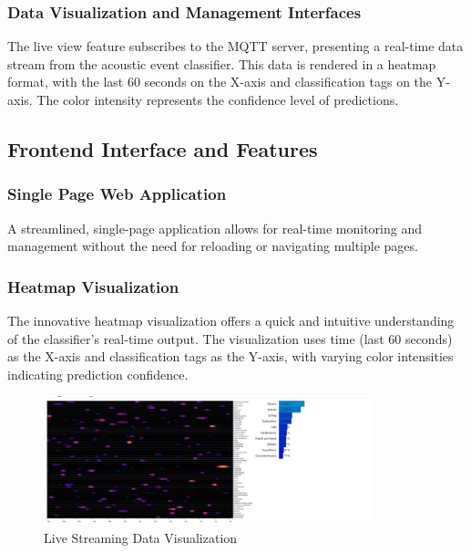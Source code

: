 \subsubsection{Data Visualization and Management Interfaces}
The live view feature subscribes to the MQTT server, presenting a real-time data stream from the acoustic event classifier. This data is rendered in a heatmap format, with the last 60 seconds on the X-axis and classification tags on the Y-axis. The color intensity represents the confidence level of predictions.



\subsection{Frontend Interface and Features}

\subsubsection{Single Page Web Application}
A streamlined, single-page application allows for real-time monitoring and management without the need for reloading or navigating multiple pages.

\subsubsection{Heatmap Visualization}
The innovative heatmap visualization offers a quick and intuitive understanding of the classifier's real-time output. The visualization uses time (last 60 seconds) as the X-axis and classification tags as the Y-axis, with varying color intensities indicating prediction confidence.

\begin{figure}[htbp]
  \centering
  \includegraphics[width=0.85\textwidth]{Pictures/heatmap}
  \caption{\label{fig:heatmap}Live Streaming Data Visualization}
\end{figure}

